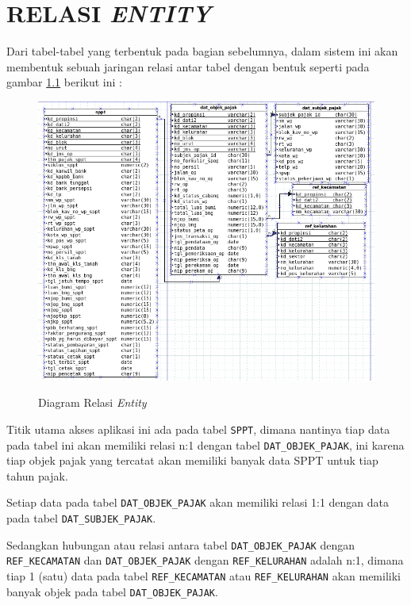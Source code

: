 \chapter{RELASI \textit{ENTITY}}

Dari tabel-tabel yang terbentuk pada bagian sebelumnya, dalam sistem ini akan membentuk sebuah jaringan relasi antar tabel dengan bentuk seperti pada gambar \ref{fig:diagram-relasi} berikut ini :

\begin{figure}[H]
	\centering
	\includegraphics[width=1\textwidth]{./resources/db-diagram}
	\label{fig:diagram-relasi}
	\caption{Diagram Relasi \textit{Entity}}
\end{figure}

Titik utama akses aplikasi ini ada pada tabel \texttt{SPPT}, dimana nantinya tiap data pada tabel ini akan memiliki relasi n:1 dengan tabel \texttt{DAT\_OBJEK\_PAJAK}, ini karena tiap objek pajak yang tercatat akan memiliki banyak data SPPT untuk tiap tahun pajak.

Setiap data pada tabel \texttt{DAT\_OBJEK\_PAJAK} akan memiliki relasi 1:1 dengan data pada tabel \texttt{DAT\_SUBJEK\_PAJAK}.

Sedangkan hubungan atau relasi antara tabel \texttt{DAT\_OBJEK\_PAJAK} dengan \texttt{REF\_KECAMATAN} dan \texttt{DAT\_OBJEK\_PAJAK} dengan \texttt{REF\_KELURAHAN} adalah n:1, dimana tiap 1 (satu) data pada tabel \texttt{REF\_KECAMATAN} atau \texttt{REF\_KELURAHAN} akan memiliki banyak objek pada tabel \texttt{DAT\_OBJEK\_PAJAK}.

